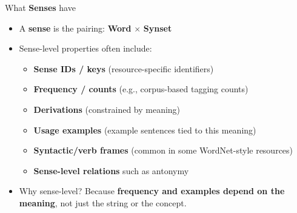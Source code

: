 \documentclass[aspectratio=169]{beamer}
\begin{document}
\begin{frame}{What \textbf{Senses} have}
\begin{itemize}
  \item A \textbf{sense} is the pairing: \textbf{Word} $\times$ \textbf{Synset}
  \item Sense-level properties often include:
    \begin{itemize}
      \item \textbf{Sense IDs / keys} (resource-specific identifiers)
      \item \textbf{Frequency / counts} (e.g., corpus-based tagging counts)
      \item \textbf{Derivations} (constrained by meaning)
      \item \textbf{Usage examples} (example sentences tied to this meaning)
      \item \textbf{Syntactic/verb frames} (common in some WordNet-style resources)
      \item \textbf{Sense-level relations} such as antonymy
    \end{itemize}
  \item Why sense-level? Because \textbf{frequency and examples depend on the meaning}, not just the string or the concept.
\end{itemize}





\end{frame}
\end{document}
